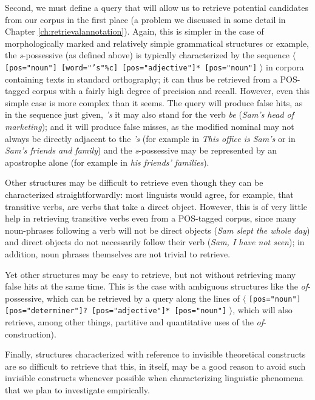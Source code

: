 Second, we must define a query that will allow us to retrieve potential candidates from our corpus in the first place (a problem we discussed in some detail in Chapter \ref{ch:retrievalannotation}). Again, this is simpler in the case of morphologically marked and relatively simple grammatical structures or example, the \textit{s}-possessive (as defined above) is typically characterized by the sequence $\langle$ \texttt{[pos="noun"] [word="'s"\%c] [pos="adjective"]* [pos="noun"]} $\rangle$ in corpora containing texts in standard orthography; it can thus be retrieved from a POS-tagged corpus with a fairly high degree of precision and recall. However, even this simple case is more complex than it seems. The query will produce false hits, as in the sequence just given, \textit{'s} it may also stand for the verb \textit{be} (\textit{Sam's head of marketing}); and it will produce false misses, as the modified nominal may not always be directly adjacent to the \textit{'s} (for example in \textit{This office is Sam's} or in \textit{Sam's friends and family}) and the \textit{s}-possessive may be represented by an apostrophe alone (for example in \textit{his friends' families}).

Other structures may be difficult to retrieve even though they can be characterized straightforwardly: most linguists would agree, for example, that transitive verbs, are verbs that take a direct object. However, this is of very little help in retrieving transitive verbs even from a POS-tagged corpus, since many noun-phrases following a verb will not be direct objects (\textit{Sam slept the whole day}) and direct objects do not necessarily follow their verb (\textit{Sam, I have not seen}); in addition, noun phrases themselves are not trivial to retrieve.

Yet other structures may be easy to retrieve, but not without retrieving many false hits at the same time. This is the case with ambiguous structures like the \textit{of}-possessive, which can be retrieved by a query along the lines of $\langle$ \texttt{[pos="noun"] [pos="determiner"]? [pos="adjective"]* [pos="noun"]} $\rangle$, which will also retrieve, among other things, partitive and quantitative uses of the \textit{of}\hyp{}construction).

Finally, structures characterized with reference to invisible theoretical constructs are so difficult to retrieve that this, in itself, may be a good reason to avoid such invisible constructs whenever possible when characterizing linguistic phenomena that we plan to investigate empirically.

